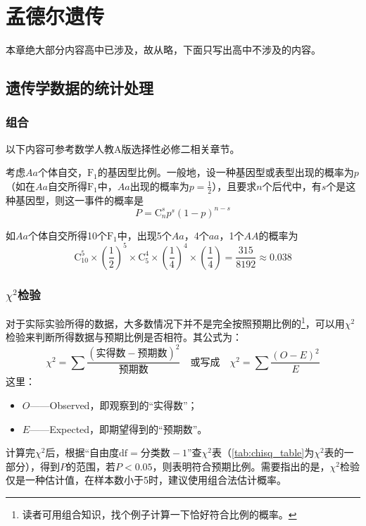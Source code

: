 \section{孟德尔遗传}

本章绝大部分内容高中已涉及，故从略，下面只写出高中不涉及的内容。

\subsection{遗传学数据的统计处理}
\subsubsection{组合}

以下内容可参考数学人教A版选择性必修二相关章节。

考虑$Aa$个体自交，$\text{F}_{1}$的基因型比例。一般地，设一种基因型或表型出现的概率为$p$（如在$Aa$自交所得$\text{F}_{1}$中，$Aa$出现的概率为$p=\frac{1}{2}$），且要求$n$个后代中，有$s$个是这种基因型，则这一事件的概率是\[P=\mathrm{C}_{n}^{s}p^{s}(1-p)^{n-s}\]

如$Aa$个体自交所得10个$\text{F}_{1}$中，出现5个$Aa$，4个$aa$，1个$AA$的概率为\[\mathrm{C}_{10}^{5}\times \left ( \frac{1}{2} \right )^{5} \times \mathrm{C}_{5}^{4}\times \left ( \frac{1}{4}  \right )^{4}\times \left ( \frac{1}{4}  \right )  =\frac{315}{8192} \approx 0.038\]

\subsubsection{$\chi^{2}$检验}

对于实际实验所得的数据，大多数情况下并不是完全按照预期比例的\footnote{读者可用组合知识，找个例子计算一下恰好符合比例的概率。}，可以用$\chi^{2}$检验来判断所得数据与预期比例是否相符。其公式为：\[\chi^{2}=\sum \frac{\left ( \text{实得数}-\text{预期数} \right ) ^{2}}{\text{预期数} }\quad\text{或写成}\quad \chi^{2}=\sum \frac{\left ( O-E\right ) ^{2}}{E}\]
这里：\begin{itemize}
	\item $O$——Observed，即观察到的“实得数”；
	\item $E$——Expected，即期望得到的“预期数”。
\end{itemize}

计算完$\chi^{2}$后，根据“$\text{自由度df}=\text{分类数}-1$”查$\chi^{2}$表（\autoref{tab:chisq_table}为$\chi^{2}$表的一部分），得到$P$的范围，若$P<0.05$，则表明符合预期比例。需要指出的是，$\chi^{2}$检验仅是一种估计值，在样本数小于5时，建议使用组合法估计概率。

